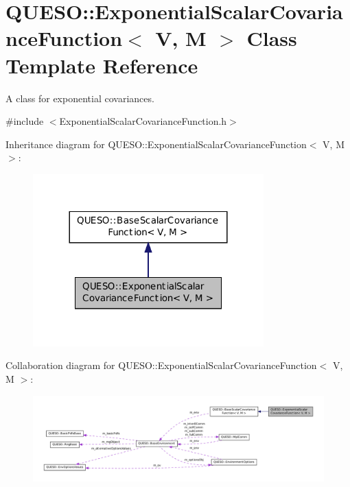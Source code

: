 \hypertarget{class_q_u_e_s_o_1_1_exponential_scalar_covariance_function}{\section{Q\-U\-E\-S\-O\-:\-:Exponential\-Scalar\-Covariance\-Function$<$ V, M $>$ Class Template Reference}
\label{class_q_u_e_s_o_1_1_exponential_scalar_covariance_function}
}


A class for exponential covariances.  




{\ttfamily \#include $<$Exponential\-Scalar\-Covariance\-Function.\-h$>$}



Inheritance diagram for Q\-U\-E\-S\-O\-:\-:Exponential\-Scalar\-Covariance\-Function$<$ V, M $>$\-:
\nopagebreak
\begin{figure}[H]
\begin{center}
\leavevmode
\includegraphics[width=252pt]{class_q_u_e_s_o_1_1_exponential_scalar_covariance_function__inherit__graph}
\end{center}
\end{figure}


Collaboration diagram for Q\-U\-E\-S\-O\-:\-:Exponential\-Scalar\-Covariance\-Function$<$ V, M $>$\-:
\nopagebreak
\begin{figure}[H]
\begin{center}
\leavevmode
\includegraphics[width=350pt]{class_q_u_e_s_o_1_1_exponential_scalar_covariance_function__coll__graph}
\end{center}
\end{figure}

